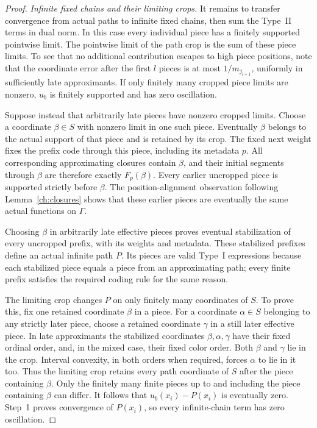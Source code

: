 \begin{proof}
\smallskip\noindent
\emph{Infinite fixed chains and their limiting crops.}
It remains to transfer convergence from actual paths to infinite fixed
chains, then sum the Type~II terms in dual norm.
In this case every individual piece has a finitely supported
pointwise limit.  The pointwise limit of the path crop is the sum of
these piece limits.  To see that no additional contribution escapes
to high piece positions, note that the coordinate error after the
first $l$ pieces is at most $1/m_{j_{l+1}}$, uniformly in sufficiently
late approximants.  If only finitely many cropped piece limits are
nonzero, $u_b$ is finitely supported and has zero oscillation.

Suppose instead that arbitrarily late pieces have nonzero cropped
limits.  Choose a coordinate $\beta\in S$ with nonzero limit in one
such piece.  Eventually $\beta$ belongs to the actual support of
that piece and is retained by its crop.  The fixed next weight fixes
the prefix code through this piece, including its metadata $p$.
All corresponding approximating closures contain $\beta$, and their
initial segments through $\beta$ are therefore exactly
$F_p(\beta)$.  Every earlier uncropped piece is supported strictly
before $\beta$.  The position-alignment observation following
Lemma~\ref{ch:closures} shows that these earlier pieces are eventually
the same actual functions on $\Gamma$.

Choosing $\beta$ in arbitrarily late effective pieces proves eventual
stabilization of every uncropped prefix, with its weights and
metadata.  These stabilized prefixes define an actual infinite path
$P$.  Its pieces are valid Type~I expressions because each stabilized
piece equals a piece from an approximating path; every finite prefix
satisfies the required coding rule for the same reason.

The limiting crop changes $P$ on only finitely many coordinates of
$S$.  To prove this, fix one retained coordinate $\beta$ in a piece.
For a coordinate $\alpha\in S$ belonging to any strictly later
piece, choose a retained coordinate $\gamma$ in a still later
effective piece.  In late approximants the stabilized coordinates
$\beta,\alpha,\gamma$ have their fixed ordinal order, and, in the
mixed case, their fixed color order.  Both $\beta$ and $\gamma$ lie
in the crop.  Interval convexity, in both orders when required,
forces $\alpha$ to lie in it too.  Thus the limiting crop retains
every path coordinate of $S$ after the piece containing $\beta$.
Only the finitely many finite pieces up to and including the piece
containing $\beta$ can differ.
It follows that $u_b(x_i)-P(x_i)$ is eventually zero.  Step~1 proves
convergence of $P(x_i)$, so every infinite-chain term has zero
oscillation.


\end{proof}
